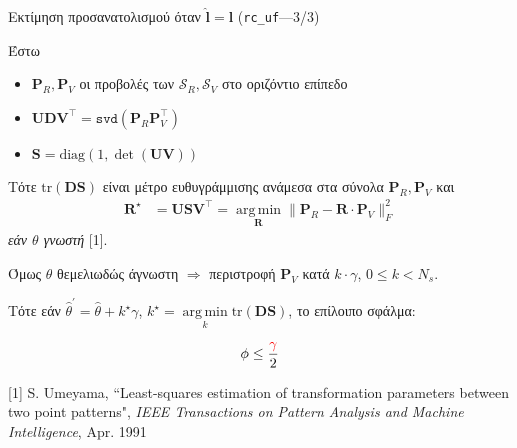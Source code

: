 \begin{frame}{Εκτίμηση προσανατολισμού όταν $\hat{\bm{l}} = \bm{l}$ (\texttt{rc\_uf}---3/3)}



  Έστω
  \begin{itemize}
    \item $\bm{P}_R, \bm{P}_V$ οι προβολές των $\mathcal{S}_R, \mathcal{S}_V$
          στο οριζόντιο επίπεδο
    \item $\bm{U} \bm{D} \bm{V}^\top = \texttt{svd}(\bm{P}_R \bm{P}_V^\top)$
    \item $\bm{S} = \text{diag}(1,\det{(\bm{U}\bm{V})})$
  \end{itemize}
  Τότε $\text{tr}(\bm{DS})$ είναι μέτρο ευθυγράμμισης ανάμεσα στα σύνολα $\bm{P}_R, \bm{P}_V$
  και
  \begin{align}
    \bm{R}^\star &= \bm{U} \bm{S} \bm{V}^\top =
                  \operatorname*{arg\,min}\limits_{\bm{R}} \|\bm{P}_R - \bm{R} \cdot \bm{P}_V\|_F^2 \nonumber
  \end{align}
   \textit{εάν $\theta$ γνωστή} [1].

   Όμως $\theta$ θεμελιωδώς άγνωστη $\Rightarrow$ περιστροφή $\bm{P}_V$ κατά
   $k\cdot\gamma$, $0 \leq k < N_s$.

   Τότε εάν $\hat{\theta}^\prime = \hat{\theta} + k^\star \gamma$,
   $k^\star = \operatorname*{arg\,min}\limits_k \text{tr}(\bm{DS})$, το επίλοιπο σφάλμα:

  \begin{align}
    \phi \leq \dfrac{\textcolor{r}{\gamma}}{2} \nonumber
  \end{align}

  \placebottom
  \tiny [1] S. Umeyama, ``Least-squares estimation of transformation parameters between two point patterns", \textit{IEEE Transactions on Pattern Analysis and Machine Intelligence}, Apr. 1991
\end{frame}
